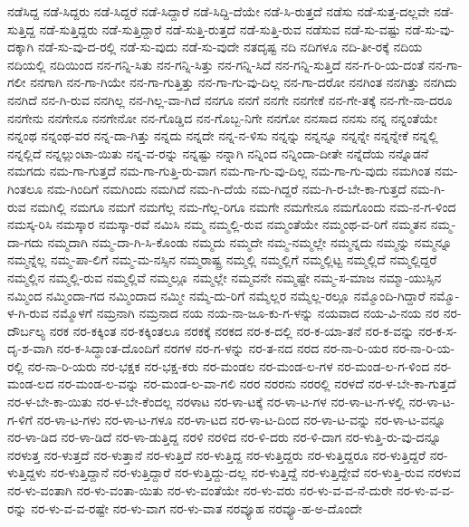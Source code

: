 {ನಡೆಸಿದ್ದ
ನಡೆ-ಸಿದ್ದರು
ನಡೆ-ಸಿದ್ದರೆ
ನಡೆ-ಸಿದ್ದಾರೆ
ನಡೆ-ಸಿದ್ದಿ-ದೆಯೇ
ನಡೆ-ಸಿ-ರುತ್ತದೆ
ನಡೆಸು
ನಡೆ-ಸುತ್ತ-ದಲ್ಲವೇ
ನಡೆ-ಸುತ್ತಿದ್ದ
ನಡೆ-ಸುತ್ತಿದ್ದರು
ನಡೆ-ಸುತ್ತಿದ್ದಾರೆ
ನಡೆ-ಸುತ್ತಿ-ರುತ್ತದೆ
ನಡೆ-ಸುತ್ತಿ-ರುವ
ನಡೆಸುವ
ನಡೆ-ಸು-ವಷ್ಟು
ನಡೆ-ಸು-ವು-ದಕ್ಕಾಗಿ
ನಡೆ-ಸು-ವು-ದ-ರಲ್ಲಿ
ನಡೆ-ಸು-ವುದು
ನಡೆ-ಸು-ವುದೇ
ನತದೃಷ್ಟ
ನದಿ
ನದಿಗಳೂ
ನದಿ-ತೀ-ರಕ್ಕೆ
ನದಿಯ
ನದಿಯಲ್ಲಿ
ನದಿಯಿಂದ
ನನ-ಗನ್ನಿ-ಸಿತು
ನನ-ಗನ್ನಿ-ಸಿತ್ತು
ನನ-ಗನ್ನಿ-ಸಿದೆ
ನನ-ಗನ್ನಿ-ಸುತ್ತಿದೆ
ನನ-ಗ-ರಿ-ಯ-ದಂತೆ
ನನ-ಗಾ-ಗಲೀ
ನನಗಾಗಿ
ನನ-ಗಾ-ಗಿಯೇ
ನನ-ಗಾ-ಗುತ್ತಿತ್ತು
ನನ-ಗಾ-ಗು-ವು-ದಿಲ್ಲ
ನನ-ಗಾ-ದರೋ
ನನಗಿಂತ
ನನಗಿತ್ತು
ನನಗಿದು
ನನಗಿದೆ
ನನ-ಗಿ-ರುವ
ನನಗಿಲ್ಲ
ನನ-ಗಿಲ್ಲ-ವಾ-ಗಿದೆ
ನನಗೂ
ನನಗೆ
ನನಗೇ
ನನಗೇಕೆ
ನನ-ಗೇ-ತಕ್ಕೆ
ನನ-ಗೇ-ನಾ-ದರೂ
ನನಗೇನು
ನನಗೇನೂ
ನನಗೇನೋ
ನನ-ಗೊಡ್ಡಿದ
ನನ-ಗೊಬ್ಬ-ನಿಗೇ
ನನಗೋ
ನನಸಾದ
ನನಸು
ನನ್ನ
ನನ್ನಂತೆಯೇ
ನನ್ನಂಥ
ನನ್ನಂಥ-ವರ
ನನ್ನ-ದಾ-ಗಿತ್ತು
ನನ್ನದು
ನನ್ನದೇ
ನನ್ನ-ನ-ಳಿಸು
ನನ್ನನ್ನು
ನನ್ನನ್ನೂ
ನನ್ನನ್ನೇ
ನನ್ನನ್ನೇಕೆ
ನನ್ನಲ್ಲಿ
ನನ್ನಲ್ಲಿದೆ
ನನ್ನಲ್ಲುಂಟಾ-ಯಿತು
ನನ್ನ-ವ-ರನ್ನು
ನನ್ನಷ್ಟು
ನನ್ನಾಗಿ
ನನ್ನಿಂದ
ನನ್ನಿಂದಾ-ದೀತೇ
ನನ್ನೆದೆಯ
ನನ್ನೊಡನೆ
ನಮಗದು
ನಮ-ಗಾ-ಗುತ್ತದೆ
ನಮ-ಗಾ-ಗುತ್ತಿ-ರು-ವಾಗ
ನಮ-ಗಾ-ಗು-ವು-ದಿಲ್ಲ
ನಮ-ಗಾ-ಗು-ವುದು
ನಮಗಿಂತ
ನಮ-ಗಿಂತಲೂ
ನಮ-ಗಿಂದಿಗೆ
ನಮಗಿಂದು
ನಮಗಿದೆ
ನಮ-ಗಿ-ದೆಯೆ
ನಮ-ಗಿದ್ದರೆ
ನಮ-ಗಿ-ರ-ಬೇ-ಕಾ-ಗುತ್ತದೆ
ನಮ-ಗಿ-ರುವ
ನಮಗಿಲ್ಲಿ
ನಮಗೂ
ನಮಗೆ
ನಮಗೆಲ್ಲ
ನಮ-ಗೆಲ್ಲ-ರಿಗೂ
ನಮಗೇ
ನಮಗೇನೂ
ನಮಗೊಂದು
ನಮ-ನ-ಗ-ಳಿಂದ
ನಮಸ್ಕ-ರಿಸಿ
ನಮಸ್ಕಾರ
ನಮಸ್ಕಾ-ರವೆ
ನಮಿಸಿ
ನಮ್ಮ
ನಮ್ಮಲ್ಲಿ-ರುವ
ನಮ್ಮಂತೆಯೇ
ನಮ್ಮಂಥ-ವ-ರಿಗೆ
ನಮ್ಮತನ
ನಮ್ಮ-ದಾ-ಗದು
ನಮ್ಮದಾಗಿ
ನಮ್ಮ-ದಾ-ಗಿ-ಸಿ-ಕೊಂಡು
ನಮ್ಮದು
ನಮ್ಮದೇ
ನಮ್ಮ-ನಮ್ಮಲ್ಲೇ
ನಮ್ಮನ್ನದು
ನಮ್ಮನ್ನು
ನಮ್ಮನ್ನೂ
ನಮ್ಮನ್ನೆಲ್ಲ
ನಮ್ಮ-ಪಾ-ಲಿಗೆ
ನಮ್ಮ-ಮ-ನಸ್ಸಿನ
ನಮ್ಮರಾಷ್ಟ್ರ
ನಮ್ಮಲ್ಲಿ
ನಮ್ಮಲ್ಲಿಗೆ
ನಮ್ಮಲ್ಲಿಟ್ಟ
ನಮ್ಮಲ್ಲಿದೆ
ನಮ್ಮಲ್ಲಿದ್ದರೆ
ನಮ್ಮಲ್ಲಿನ
ನಮ್ಮಲ್ಲಿ-ರುವ
ನಮ್ಮಲ್ಲಿವೆ
ನಮ್ಮಲ್ಲೂ
ನಮ್ಮಲ್ಲೇ
ನಮ್ಮವನೇ
ನಮ್ಮಷ್ಟೇ
ನಮ್ಮ-ಸ-ಮಾಜ
ನಮ್ಮಾ-ಯುಸ್ಸಿನ
ನಮ್ಮಿಂದ
ನಮ್ಮಿಂದಾ-ಗದ
ನಮ್ಮಿಂದಾದ
ನಮ್ಮೀ
ನಮ್ಮೆ-ದು-ರಿಗೆ
ನಮ್ಮೆಲ್ಲರ
ನಮ್ಮೆಲ್ಲ-ರಲ್ಲೂ
ನಮ್ಮೊಂದಿ-ಗಿದ್ದಾರೆ
ನಮ್ಮೊ-ಳ-ಗಿ-ರುವ
ನಮ್ಮೊಳಗೆ
ನಮ್ರನಾಗಿ
ನಮ್ರನಾದ
ನಯ
ನಯ-ನಾ-ಜೂ-ಕು-ಗ-ಳನ್ನು
ನಯವಾದ
ನಯ-ವಿ-ನಯ
ನರ
ನರ-ದೌರ್ಬಲ್ಯ
ನರಕ
ನರ-ಕಕ್ಕಿಂತ
ನರ-ಕಕ್ಕಿಂತಲೂ
ನರಕಕ್ಕೆ
ನರಕದ
ನರ-ಕ-ದಲ್ಲಿ
ನರ-ಕ-ಯಾ-ತನೆ
ನರ-ಕ-ವನ್ನು
ನರ-ಕ-ಸ-ದೃ-ಶ-ವಾಗಿ
ನರ-ಕ-ಸಿದ್ಧಾಂತ-ದೊಂದಿಗೆ
ನರಗಳ
ನರ-ಗ-ಳನ್ನು
ನರ-ತ-ನದ
ನರದ
ನರ-ನಾ-ರಿ-ಯರ
ನರ-ನಾ-ರಿ-ಯ-ರಲ್ಲಿ
ನರ-ನಾ-ರಿ-ಯರು
ನರ-ಭಕ್ಷಕ
ನರ-ಭಕ್ಷ-ಕರು
ನರ-ಮಂಡಲ
ನರ-ಮಂಡ-ಲ-ಗಳ
ನರ-ಮಂಡ-ಲ-ಗ-ಳಿಂದ
ನರ-ಮಂಡ-ಲದ
ನರ-ಮಂಡ-ಲ-ವನ್ನು
ನರ-ಮಂಡ-ಲ-ವಾ-ಗಲಿ
ನರರ
ನರರನು
ನರರಲ್ಲಿ
ನರಳದೆ
ನರ-ಳ-ಬೇ-ಕಾ-ಗುತ್ತದೆ
ನರ-ಳ-ಬೇ-ಕಾ-ಯಿತು
ನರ-ಳ-ಬೇ-ಕೆಂದಲ್ಲ
ನರಳಾಟ
ನರ-ಳಾ-ಟಕ್ಕೆ
ನರ-ಳಾ-ಟ-ಗಳ
ನರ-ಳಾ-ಟ-ಗ-ಳಲ್ಲಿ
ನರ-ಳಾ-ಟ-ಗ-ಳಿಗೆ
ನರ-ಳಾ-ಟ-ಗಳು
ನರ-ಳಾ-ಟ-ಗಳೂ
ನರ-ಳಾ-ಟದ
ನರ-ಳಾ-ಟ-ದಿಂದ
ನರ-ಳಾ-ಟ-ವನ್ನು
ನರ-ಳಾ-ಟ-ವನ್ನೂ
ನರ-ಳಾ-ಡಿದ
ನರ-ಳಾ-ಡಿದೆ
ನರ-ಳಾ-ಡುತ್ತಿದ್ದ
ನರಳಿ
ನರಳಿದ
ನರ-ಳಿ-ದರು
ನರ-ಳಿ-ದಾಗ
ನರ-ಳುತ್ತಿ-ರು-ವು-ದನ್ನೂ
ನರಳುತ್ತ
ನರ-ಳುತ್ತದೆ
ನರ-ಳುತ್ತಾನೆ
ನರ-ಳುತ್ತಿದೆ
ನರ-ಳುತ್ತಿದ್ದ
ನರ-ಳುತ್ತಿದ್ದರು
ನರ-ಳುತ್ತಿದ್ದರೂ
ನರ-ಳುತ್ತಿದ್ದರೆ
ನರ-ಳುತ್ತಿದ್ದಳು
ನರ-ಳುತ್ತಿದ್ದಾನೆ
ನರ-ಳುತ್ತಿದ್ದಾರೆ
ನರ-ಳುತ್ತಿದ್ದು-ದಲ್ಲ
ನರ-ಳುತ್ತಿದ್ದೆ
ನರ-ಳುತ್ತಿದ್ದೇವೆ
ನರ-ಳುತ್ತಿ-ರುವ
ನರಳುವ
ನರ-ಳು-ವಂತಾಗಿ
ನರ-ಳು-ವಂತಾ-ಯಿತು
ನರ-ಳು-ವಂತೆಯೇ
ನರ-ಳು-ವರು
ನರ-ಳು-ವ-ವ-ನೆ-ದುರೇ
ನರ-ಳು-ವ-ವ-ರನ್ನು
ನರ-ಳು-ವ-ವ-ರಷ್ಟೇ
ನರ-ಳು-ವಾಗ
ನರ-ಳು-ವಾತ
ನರವ್ಯೂಹ
ನರವ್ಯೂ-ಹ-ಅ-ದೊಂದೇ
}
